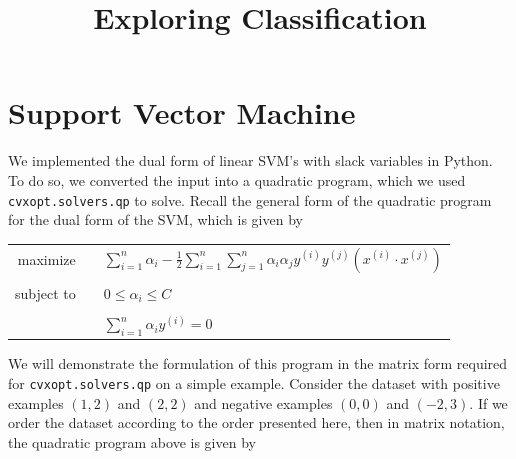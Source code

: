 \documentclass{sigchi}
\begin{document}
\title{Exploring Classification}


\maketitle

\large

\section{Support Vector Machine}


We implemented the dual form of linear SVM's with slack variables in Python. To do so, we converted the input into a quadratic program, which we used \texttt{cvxopt.solvers.qp} to solve. Recall the general form of the quadratic program for the dual form of the SVM, which is given by

\normalsize
\begin{center}\begin{tabular}{r p{0.0in} l }
maximize && $ \displaystyle \sum_{i =1}^n \alpha_i - \frac{1}{2}\sum_{i = 1}^{n}\sum_{j = 1}^n \alpha_i\alpha_jy^{(i)}y^{(j)}(x^{(i)}\cdot x^{(j)}) $
\\ && \\
subject to && $ \displaystyle 0 \leq \alpha_i \leq C$ 
\\ && \\
&&		      $ \displaystyle \sum_{i = 1}^{n} \alpha_iy^{(i)} = 0$
\end{tabular}\end{center}

\large

We will demonstrate the formulation of this program in the matrix form required for \texttt{cvxopt.solvers.qp} on a simple example. Consider the dataset with positive examples $(1, 2)$ and $(2, 2)$ and negative examples $(0, 0)$ and $(-2, 3)$.
If we order the dataset according to the order presented here, then in matrix notation, the quadratic program above is given by
\end{document}
